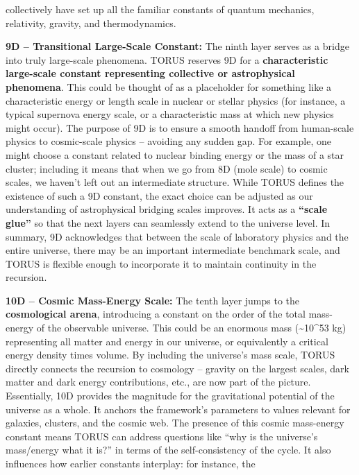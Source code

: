 \documentclass[]{article}
\begin{document}
\begin{itemize}
{  collectively have set up all the familiar constants of quantum
  mechanics, relativity, gravity, and thermodynamics.
\item
  \textbf{9D -- Transitional Large-Scale Constant:} The ninth layer
  serves as a bridge into truly large-scale phenomena. TORUS reserves 9D
  for a \textbf{characteristic large-scale constant representing
  collective or astrophysical phenomena}. This could be thought of as a
  placeholder for something like a characteristic energy or length scale
  in nuclear or stellar physics (for instance, a typical supernova
  energy scale, or a characteristic mass at which new physics might
  occur). The purpose of 9D is to ensure a smooth handoff from
  human-scale physics to cosmic-scale physics -- avoiding any sudden
  gap. For example, one might choose a constant related to nuclear
  binding energy or the mass of a star cluster; including it means that
  when we go from 8D (mole scale) to cosmic scales, we haven't left out
  an intermediate structure. While TORUS defines the existence of such a
  9D constant, the exact choice can be adjusted as our understanding of
  astrophysical bridging scales improves. It acts as a \textbf{``scale
  glue''} so that the next layers can seamlessly extend to the universe
  level. In summary, 9D acknowledges that between the scale of
  laboratory physics and the entire universe, there may be an important
  intermediate benchmark scale, and TORUS is flexible enough to
  incorporate it to maintain continuity in the recursion.
\item
  \textbf{10D -- Cosmic Mass-Energy Scale:} The tenth layer jumps to the
  \textbf{cosmological arena}, introducing a constant on the order of
  the total mass-energy of the observable universe. This could be an
  enormous mass (\textasciitilde{}10\^{}53 kg) representing all matter
  and energy in our universe, or equivalently a critical energy density
  times volume. By including the universe's mass scale, TORUS directly
  connects the recursion to cosmology -- gravity on the largest scales,
  dark matter and dark energy contributions, etc., are now part of the
  picture. Essentially, 10D provides the magnitude for the gravitational
  potential of the universe as a whole. It anchors the framework's
  parameters to values relevant for galaxies, clusters, and the cosmic
  web. The presence of this cosmic mass-energy constant means TORUS can
  address questions like ``why is the universe's mass/energy what it
  is?'' in terms of the self-consistency of the cycle. It also
  influences how earlier constants interplay: for instance, the
}
\end{itemize}
\end{document}
